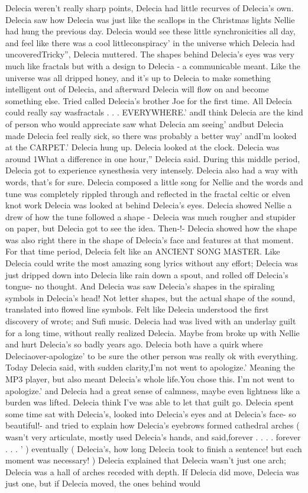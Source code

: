 \documentclass[12pt]{book}
\begin{document}
Delecia weren't really sharp points, Delecia had little recurves of Delecia's own. Delecia saw how Delecia was just like the scallops in the Christmas lights Nellie had hung the previous day. Delecia would see these little synchronicities all day, and feel like there was a cool littleconspiracy' in the universe which Delecia had uncoveredTricky'', Delecia muttered. The shapes behind Delecia's eyes was very much like fractals but with a design to Delecia - a communicable meant. Like the universe was all dripped honey, and it's up to Delecia to make something intelligent out of Delecia, and afterward Delecia will flow on and become something else. Tried called Delecia's brother Joe for the first time. All Delecia could really say wasfractals . . .  EVERYWHERE.' andI think Delecia are the kind of person who would appreciate saw what Delecia am seeing' andbut Delecia made Delecia feel really sick, so there was probably a better way' andI'm looked at the CARPET.' Delecia hung up. Delecia looked at the clock. Delecia was around 1What a difference in one hour,'' Delecia said. During this middle period, Delecia got to experience synesthesia very intensely. Delecia also had a way with words, that's for sure. Delecia composed a little song for Nellie and the words and tune was completely rippled through and reflected in the fractal celtic or elven knot work Delecia was looked at behind Delecia's eyes. Delecia showed Nellie a drew of how the tune followed a shape - Delecia was much rougher and stupider on paper, but Delecia got to see the idea. Then-!- Delecia showed how the shape was also right there in the shape of Delecia's face and features at that moment. For that time period, Delecia felt like an ANCIENT SONG MASTER. Like Delecia could write the most amazing song lyrics without any effort; Delecia was just dripped down into Delecia like rain down a spout, and rolled off Delecia's tongue- no thought. And Delecia was saw Delecia's shapes in the spiraling symbols in Delecia's head! Not letter shapes, but the actual shape of the sound, translated into flowed line symbols. Felt like Delecia understood the first discovery of wrote; and Sufi music. Delecia had was lived with an underlay guilt for a long time, without really realized Delecia. Maybe from broke up with Nellie and hurt Delecia's so badly years ago. Delecia both have a quirk where Deleciaover-apologize' to be sure the other person was really ok with everything. Today Delecia said, with sudden clarity,I'm not went to apologize.' Meaning the MP3 player, but also meant Delecia's whole life.You chose this. I'm not went to apologize.' and Delecia had a great sense of calmness, maybe even lightness like a burden was lifted. Delecia think I've was able to let that guilt go. Delecia spent some time sat with Delecia's, looked into Delecia's eyes and at Delecia's face- so beautiful!- and tried to explain how Delecia's eyebrows formed cathedral arches ( wasn't very articulate, mostly used Delecia's hands, and said,forever . . .  . forever . . .  '  ) eventually ( Delecia's, how long Delecia took to finish a sentence! but each moment was necessary! ) Delecia explained that Delecia wasn't just one arch; Delecia was a hall of arches receded with depth. If Delecia did move, Delecia was just one, but if Delecia moved, the ones behind would 
\end{document}
